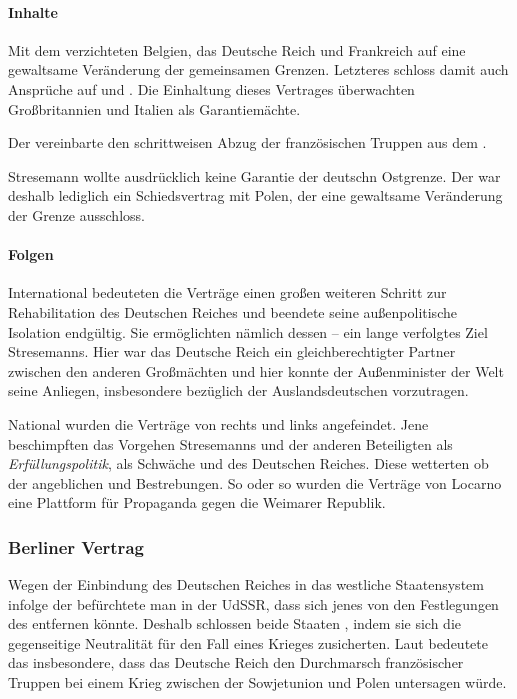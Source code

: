 \paragraph{Inhalte} Mit dem  verzichteten Belgien, das
Deutsche Reich und Frankreich auf eine gewaltsame Veränderung der
gemeinsamen Grenzen.  Letzteres schloss damit auch Ansprüche auf
 und . Die Einhaltung dieses
Vertrages überwachten Großbritannien und Italien als Garantiemächte.

Der  vereinbarte den schrittweisen Abzug der
französischen Truppen aus dem .

Stresemann wollte ausdrücklich keine Garantie der deutschn Ostgrenze.
Der  war deshalb lediglich ein Schiedsvertrag mit Polen,
der eine gewaltsame Veränderung der Grenze ausschloss.

\paragraph{Folgen} International bedeuteten die Verträge einen großen
weiteren Schritt zur Rehabilitation des Deutschen Reiches und beendete
seine außenpolitische Isolation endgültig. Sie ermöglichten nämlich
dessen  -- ein lange
verfolgtes Ziel Stresemanns. Hier war das Deutsche Reich ein
gleichberechtigter Partner zwischen den anderen Großmächten und hier
konnte der Außenminister der Welt seine Anliegen, insbesondere
bezüglich der Auslandsdeutschen vorzutragen.

National wurden die Verträge von rechts und links angefeindet. Jene
beschimpften das Vorgehen Stresemanns und der anderen Beteiligten als
\emph{Erfüllungspolitik}, als Schwäche und
 des Deutschen Reiches. Diese wetterten ob der angeblichen
 und  Bestrebungen. So
oder so wurden die Verträge von Locarno eine Plattform für Propaganda
gegen die Weimarer Republik.


\subsubsection{Berliner Vertrag}

Wegen der Einbindung des Deutschen Reiches in das westliche
Staatensystem infolge der 
befürchtete man in der UdSSR, dass sich jenes von den Festlegungen des
entfernen könnte.  Deshalb schlossen beide Staaten , indem sie sich die gegenseitige Neutralität
für den Fall eines Krieges zusicherten. Laut \cite[33]{IzpBWeimRep}
bedeutete das insbesondere, dass das Deutsche Reich den Durchmarsch
französischer Truppen bei einem Krieg zwischen der Sowjetunion und
Polen untersagen würde.



